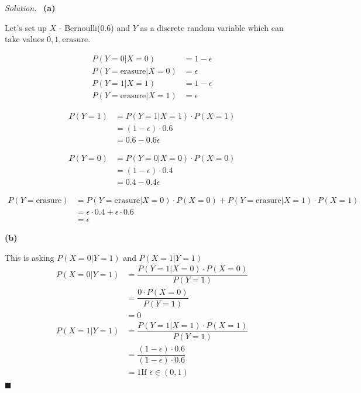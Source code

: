 \documentclass[11pt]{article}
\newenvironment{solution}
{\par\medskip\noindent\textit{Solution.}\ }
{\hfill$\blacksquare$\par\medskip}
\begin{document}
    \begin{solution}
        \textbf{(a)}

        Let's set up $X$ - Bernoulli(0.6) and $Y$ as a discrete random variable which can take values $0, 1, \text{erasure}$.

        \begin{align*}
            P(Y=0 | X=0) &= 1 - \epsilon \\
            P(Y=\text{erasure} | X = 0) &= \epsilon \\
            P(Y=1 | X=1) &= 1 - \epsilon \\
            P(Y=\text{erasure} | X = 1) &= \epsilon
        \end{align*}

        \begin{align*}
            P(Y = 1) &= P(Y=1 | X=1) \cdot P(X=1) \\
            &= (1 - \epsilon) \cdot 0.6 \\
            &= 0.6 - 0.6 \epsilon
        \end{align*}

        \begin{align*}
            P(Y = 0) &= P(Y=0 | X=0) \cdot P(X=0) \\
            &= (1 - \epsilon) \cdot 0.4 \\
            &= 0.4 - 0.4 \epsilon
        \end{align*}

        \begin{align*}
            P(Y = \text{erasure}) &= P(Y=\text{erasure} | X=0) \cdot P(X=0) + P(Y=\text{erasure} | X=1) \cdot P(X=1) \\
            &= \epsilon \cdot 0.4 + \epsilon \cdot 0.6 \\
            &= \epsilon
        \end{align*}

        \vspace{1em}
        \textbf{(b)}

        This is asking $P(X=0 | Y=1)$ and $P(X=1 | Y=1)$
        \begin{align*}
            P(X = 0 | Y = 1) &= \dfrac{P(Y = 1 | X = 0) \cdot P(X = 0)}{P(Y = 1)} \\
            &= \dfrac{0 \cdot P(X = 0)}{P(Y = 1)} \\
            &= 0
        \end{align*}
        \begin{align*}
            P(X = 1 | Y = 1) &= \dfrac{P(Y = 1 | X = 1) \cdot P(X = 1)}{P(Y = 1)} \\
            &= \dfrac{(1 - \epsilon) \cdot 0.6}{(1 - \epsilon) \cdot 0.6} \\
            &= 1 \text {If $\epsilon \in (0, 1)$}
        \end{align*}
    \end{solution}
\end{document}
